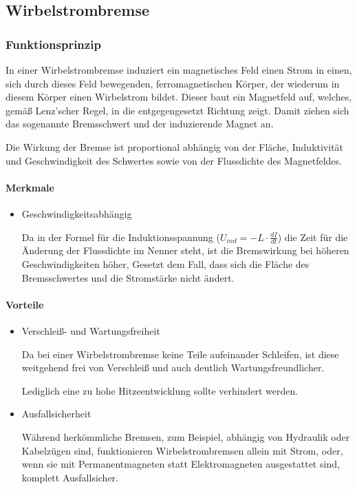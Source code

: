 

\subsection{Wirbelstrombremse}

\subsubsection{Funktionsprinzip}

In einer Wirbelstrombremse induziert ein magnetisches Feld einen Strom in einen, sich durch dieses Feld bewegenden, ferromagnetischen Körper, der wiederum in diesem Körper einen Wirbelstrom bildet. Dieser baut ein Magnetfeld auf, welches, gemäß Lenz'scher Regel, in die entgegengesetzt Richtung zeigt. Damit ziehen sich das sogenannte Bremsschwert und der induzierende Magnet an.

Die Wirkung der Bremse ist proportional abhängig von der Fläche, Induktivität und Geschwindigkeit des Schwertes sowie von der Flussdichte des Magnetfeldes.


\paragraph{Merkmale}

\begin{itemize}

	\item Geschwindigkeitsabhängig
	
Da in der Formel für die Induktionsspannung ($U_{ind}=-L \cdot \frac{dI}{dt}$) die Zeit für die Änderung der Flussdichte im Nenner steht, ist die Bremswirkung bei höheren Geschwindigkeiten höher, Gesetzt dem Fall, dass sich die Fläche des Bremsschwertes und die Stromstärke nicht ändert.

\end{itemize}


\paragraph{Vorteile}

\begin{itemize}
	\item Verschleiß- und Wartungsfreiheit
	
Da bei einer Wirbelstrombremse keine Teile aufeinander Schleifen, ist diese weitgehend frei von Verschleiß und auch deutlich Wartungsfreundlicher.

Lediglich eine zu hohe Hitzeentwicklung sollte verhindert werden.

	\item Ausfallsicherheit
	
Während herkömmliche Bremsen, zum Beispiel, abhängig von Hydraulik oder Kabelzügen sind, funktionieren Wirbelstrombremsen allein mit Strom, oder, wenn sie mit Permanentmagneten statt Elektromagneten ausgestattet sind, komplett Ausfallsicher.

\end{itemize}


